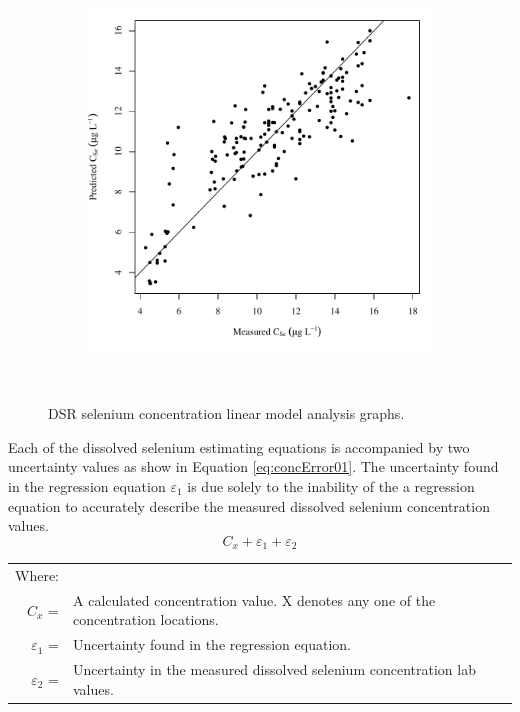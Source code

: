 \subfiguremid
\begin{landscape}
	\begin{figure}
		\begin{subfigure}{0.7\textwidth}
			\centering
			\includegraphics[width=\tableCustomSize]{"Figures/Results_DSR/Stochastic/Conc Model pred v meas DDIV"}
		\end{subfigure}\\
		\caption{DSR selenium concentration linear model analysis graphs.}
	\end{figure}
\end{landscape}
\subfiguretop

Each of the dissolved selenium estimating equations is accompanied by two uncertainty values as show in Equation \ref{eq:concError01}.  The uncertainty found in the regression equation $ \varepsilon_1 $ is due solely to the inability of the a regression equation to accurately describe the measured dissolved selenium concentration values.  
\begin{equation}
\label{eq:concError01}
C_x + \varepsilon_1 + \varepsilon_2
\end{equation}
\begin{tabular}{r p{5.5in}}
	Where: \\
	$ C_x $ = & A calculated concentration value.  X denotes any one of the concentration locations.\\
	$ \varepsilon_1 $ = & Uncertainty found in the regression equation.\\
	$ \varepsilon_2 $ = & Uncertainty in the measured dissolved selenium concentration lab values.\\
\end{tabular}\\

